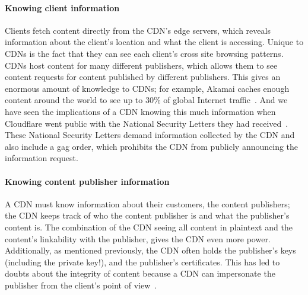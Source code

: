 
\paragraph{Knowing client information} Clients fetch content directly from the CDN's edge servers, which reveals 
information about the client's location and what the client is accessing.  Unique to CDNs is the fact that 
they can see each client's cross site browsing patterns.  CDNs host content for many different publishers, which allows 
them to see content requests for content published by different publishers.  This gives an enormous amount of 
knowledge to CDNs; for example, Akamai caches enough content around the world to see up to 30\% of global Internet 
traffic~\cite{akamai_global_traffic}.  And we have seen the implications of a CDN knowing this much information when Cloudflare 
went public with the National Security Letters they had received~\cite{cloudflare_nsl}. These National Security Letters 
demand information collected by the CDN and also include a gag order, which prohibits the CDN from publicly announcing 
the information request.  

\paragraph{Knowing content publisher information} A CDN must know information
about their customers, the content
publishers; the CDN keeps track of who the content publisher is and 
what the publisher's content is.  The combination of the CDN seeing all content in plaintext and the content's 
linkability with the publisher, gives the CDN even more power.  Additionally, as mentioned previously, the CDN often 
holds the publisher's keys (including the private key!), and the publisher's certificates.  This has led to doubts 
about the integrity of content because a CDN can impersonate the publisher from the client's point of view~\cite{levy2015stickler}.

